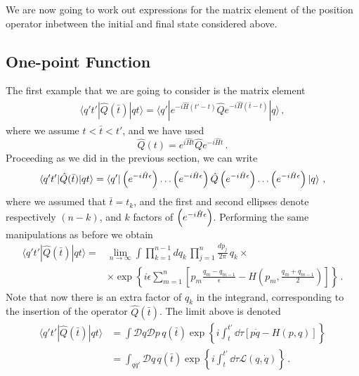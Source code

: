 \documentclass[notes]{subfiles}
\begin{document}
We are now going to work out expressions for the matrix element of the
position operator inbetween the initial and final state considered
above. 

\subsection{One-point Function}
\label{sec:one-point-function}

The first example that we are going to consider is the matrix element
\begin{align}
  \label{eq:OnePtDef}
  \langle q't' | \hat{Q}(\bar{t}) | q t\rangle = 
  \langle q' | e^{-i \hat{H}(t'-t)} \hat{Q} e^{-i \hat{H}(\bar{t}-t)}
  | q\rangle\, ,
\end{align}
where we assume $t<\bar{t}<t'$, and we have used
\begin{equation}
  \label{eq:HeisenOpEvol}
  \hat{Q}(t) = e^{i\hat{H} t} \hat{Q} e^{-i\hat{H} t}\, .
\end{equation}
Proceeding as we did in the previous section, we can write
\begin{align}
  \label{eq:CorrOne}
  \langle q't' | \hat{Q}(\bar{t}) | q t\rangle = 
  \bra{q'} \left(e^{-i \hat{H} \epsilon}\right) \ldots \left(e^{-i \hat{H} \epsilon}\right) \hat{Q} \left(e^{-i \hat{H} \epsilon}\right) \ldots
  \left(e^{-i \hat{H} \epsilon}\right) \ket{q}\, ,
\end{align}
where we assumed that $\bar{t}=t_k$, and the first and second ellipses
denote respectively $(n-k)$, and $k$ factors of $\left(e^{-i \hat{H} \epsilon}\right)$. Performing
the same manipulations as before we obtain
\begin{align}
  \langle q't' | \hat{Q}(\bar{t}) | q t\rangle =& 
  \lim_{n\to\infty} \int \prod_{k=1}^{n-1}dq_k\, 
  \prod_{j=1}^{n} \frac{dp_j}{2\pi}\, q_k \times \\
  &\times \exp \left\{
    i\epsilon \sum_{m=1}^{n} \left[
    p_m \frac{q_m-q_{m-1}}{\epsilon} - H\left(p_m, 
    \frac{q_m+q_{m-1}}{2}\right)
    \right]
    \right\}\, .
\end{align}
Note that now there is an extra factor of $q_k$ in the integrand,
corresponding to the insertion of the operator $\hat{Q}(\bar{t})$. The
limit above  is denoted
\begin{align}
  \langle q't' | \hat{Q}(\bar{t}) | q t\rangle &= 
  \int \mathcal{D}q \mathcal{D}p \, q(\bar{t}) 
  \exp \left\{
  i \int_t^{t'} \dd{\tau} \left[
  p \dot{q} - H(p,q)
  \right]
  \right\}\\
&= \int_{qq'} \mathcal{D}q \, q(\bar{t}) 
  \exp \left\{
  i \int_t^{t'} \dd{\tau} \mathcal{L}(q,\dot{q})
  \right\}\, .
\end{align}
\end{document}

